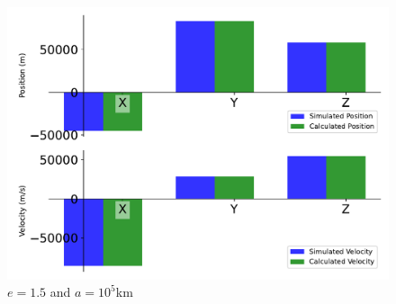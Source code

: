 \begin{figure}[htbp]\centerline{\includegraphics[height=0.7\textwidth, keepaspectratio]{AutoTeX/IncHyp_e_2}}\caption{$e = 1.5$ and $a = 10^5$km}\label{fig:IncHyp_e_2}\end{figure}